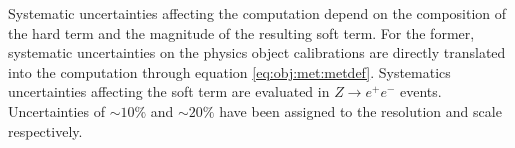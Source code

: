 Systematic uncertainties affecting the \MET computation depend on the composition of the hard term and the magnitude of the resulting soft term. For the former, systematic uncertainties on the physics object calibrations are directly translated into the \MET computation through equation \ref{eq:obj:met:metdef}. Systematics uncertainties affecting the soft term are evaluated in $Z\to e^{+}e^{-}$ events. Uncertainties of $\sim10\%$ and $\sim20\%$ have been assigned to the resolution and scale respectively.



